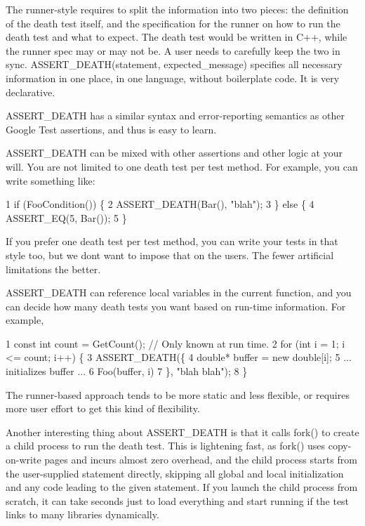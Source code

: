 \begin{DoxyItemize}
\item The runner-\/style requires to split the information into two pieces\+: the definition of the death test itself, and the specification for the runner on how to run the death test and what to expect. The death test would be written in C++, while the runner spec may or may not be. A user needs to carefully keep the two in sync. {\ttfamily A\+S\+S\+E\+R\+T\+\_\+\+D\+E\+A\+T\+H(statement, expected\+\_\+message)} specifies all necessary information in one place, in one language, without boilerplate code. It is very declarative.
\item {\ttfamily A\+S\+S\+E\+R\+T\+\_\+\+D\+E\+A\+TH} has a similar syntax and error-\/reporting semantics as other Google Test assertions, and thus is easy to learn.
\item {\ttfamily A\+S\+S\+E\+R\+T\+\_\+\+D\+E\+A\+TH} can be mixed with other assertions and other logic at your will. You are not limited to one death test per test method. For example, you can write something like\+: 
\begin{DoxyCode}
1 if (FooCondition()) \{
2   ASSERT\_DEATH(Bar(), "blah");
3 \} else \{
4   ASSERT\_EQ(5, Bar());
5 \}
\end{DoxyCode}
 If you prefer one death test per test method, you can write your tests in that style too, but we don\textquotesingle{}t want to impose that on the users. The fewer artificial limitations the better.
\item {\ttfamily A\+S\+S\+E\+R\+T\+\_\+\+D\+E\+A\+TH} can reference local variables in the current function, and you can decide how many death tests you want based on run-\/time information. For example, 
\begin{DoxyCode}
1 const int count = GetCount();  // Only known at run time.
2 for (int i = 1; i <= count; i++) \{
3   ASSERT\_DEATH(\{
4     double* buffer = new double[i];
5     ... initializes buffer ...
6     Foo(buffer, i)
7   \}, "blah blah");
8 \}
\end{DoxyCode}
 The runner-\/based approach tends to be more static and less flexible, or requires more user effort to get this kind of flexibility.
\end{DoxyItemize}

Another interesting thing about {\ttfamily A\+S\+S\+E\+R\+T\+\_\+\+D\+E\+A\+TH} is that it calls {\ttfamily fork()} to create a child process to run the death test. This is lightening fast, as {\ttfamily fork()} uses copy-\/on-\/write pages and incurs almost zero overhead, and the child process starts from the user-\/supplied statement directly, skipping all global and local initialization and any code leading to the given statement. If you launch the child process from scratch, it can take seconds just to load everything and start running if the test links to many libraries dynamically.

